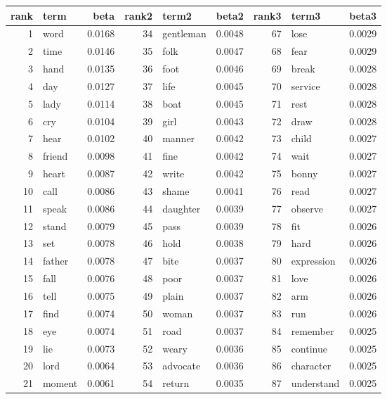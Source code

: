 \begin{table}[ht]
\centering
\begin{tabular}{rlrrlrrlr}
  \hline
rank & term & beta & rank2 & term2 & beta2 & rank3 & term3 & beta3 \\ 
  \hline
1 & word & 0.0168 & 34 & gentleman & 0.0048 & 67 & lose & 0.0029 \\ 
  2 & time & 0.0146 & 35 & folk & 0.0047 & 68 & fear & 0.0029 \\ 
  3 & hand & 0.0135 & 36 & foot & 0.0046 & 69 & break & 0.0028 \\ 
  4 & day & 0.0127 & 37 & life & 0.0045 & 70 & service & 0.0028 \\ 
  5 & lady & 0.0114 & 38 & boat & 0.0045 & 71 & rest & 0.0028 \\ 
  6 & cry & 0.0104 & 39 & girl & 0.0043 & 72 & draw & 0.0028 \\ 
  7 & hear & 0.0102 & 40 & manner & 0.0042 & 73 & child & 0.0027 \\ 
  8 & friend & 0.0098 & 41 & fine & 0.0042 & 74 & wait & 0.0027 \\ 
  9 & heart & 0.0087 & 42 & write & 0.0042 & 75 & bonny & 0.0027 \\ 
  10 & call & 0.0086 & 43 & shame & 0.0041 & 76 & read & 0.0027 \\ 
  11 & speak & 0.0086 & 44 & daughter & 0.0039 & 77 & observe & 0.0027 \\ 
  12 & stand & 0.0079 & 45 & pass & 0.0039 & 78 & fit & 0.0026 \\ 
  13 & set & 0.0078 & 46 & hold & 0.0038 & 79 & hard & 0.0026 \\ 
  14 & father & 0.0078 & 47 & bite & 0.0037 & 80 & expression & 0.0026 \\ 
  15 & fall & 0.0076 & 48 & poor & 0.0037 & 81 & love & 0.0026 \\ 
  16 & tell & 0.0075 & 49 & plain & 0.0037 & 82 & arm & 0.0026 \\ 
  17 & find & 0.0074 & 50 & woman & 0.0037 & 83 & run & 0.0026 \\ 
  18 & eye & 0.0074 & 51 & road & 0.0037 & 84 & remember & 0.0025 \\ 
  19 & lie & 0.0073 & 52 & weary & 0.0036 & 85 & continue & 0.0025 \\ 
  20 & lord & 0.0064 & 53 & advocate & 0.0036 & 86 & character & 0.0025 \\ 
  21 & moment & 0.0061 & 54 & return & 0.0035 & 87 & understand & 0.0025 \\ 

\end{tabular}
\end{table}
